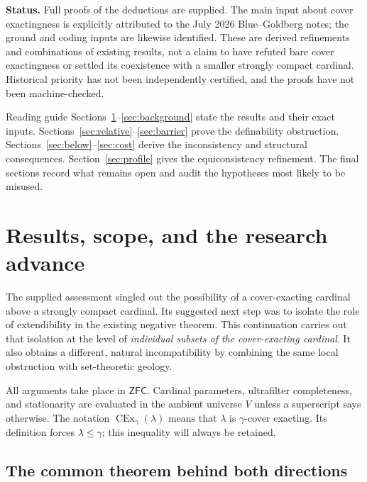 \documentclass[11pt,letterpaper]{article}
\theoremstyle{definition}
\newcommand{\ZFC}{\mathsf{ZFC}}
\newcommand{\CEx}{\operatorname{CEx}}
\begin{document}
\textbf{Status.} Full proofs of the deductions are supplied. The main input about cover exactingness is explicitly attributed to the July 2026 Blue--Goldberg notes; the ground and coding inputs are likewise identified. These are derived refinements and combinations of existing results, not a claim to have refuted bare cover exactingness or settled its coexistence with a smaller strongly compact cardinal. Historical priority has not been independently certified, and the proofs have not been machine-checked.

\clearpage
\tableofcontents
\vspace{10pt}
\begin{assessment}{Reading guide}
Sections~\ref{sec:main}--\ref{sec:background} state the results and their exact inputs. Sections~\ref{sec:relative}--\ref{sec:barrier} prove the definability obstruction. Sections~\ref{sec:below}--\ref{sec:cost} derive the inconsistency and structural consequences. Section~\ref{sec:profile} gives the equiconsistency refinement. The final sections record what remains open and audit the hypotheses most likely to be misused.
\end{assessment}

\clearpage
\section{Results, scope, and the research advance}\label{sec:main}

The supplied assessment singled out the possibility of a cover-exacting cardinal above a strongly compact cardinal. Its suggested next step was to isolate the role of extendibility in the existing negative theorem. This continuation carries out that isolation at the level of \emph{individual subsets of the cover-exacting cardinal}. It also obtains a different, natural incompatibility by combining the same local obstruction with set-theoretic geology.

All arguments take place in $\ZFC$. Cardinal parameters, ultrafilter completeness, and stationarity are evaluated in the ambient universe $V$ unless a superscript says otherwise. The notation $\CEx_\gamma(\lambda)$ means that $\lambda$ is $\gamma$-cover exacting. Its definition forces $\lambda\leq\gamma$; this inequality will always be retained.

\subsection{The common theorem behind both directions}
\end{document}
